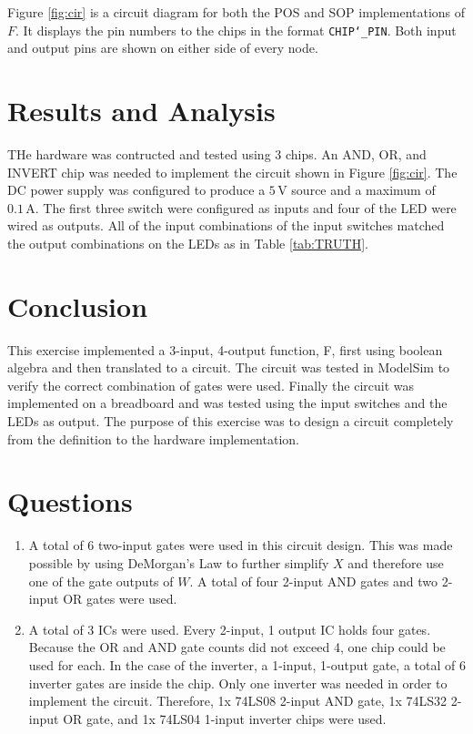 \documentclass[CMPE]{KGCOEReport}
\begin{document}
Figure \ref{fig:cir} is a circuit diagram for both the POS and SOP implementations of $F$. It displays the pin numbers to the chips in the format \texttt{CHIP\char`_PIN}. Both input and output pins are shown on either side of every node.

\section*{Results and Analysis}

THe hardware was contructed and tested using 3 chips. An AND, OR, and INVERT chip was needed to implement the circuit shown in Figure \ref{fig:cir}. The DC power supply was configured to produce a $5\,\si\volt$ source and a maximum of $0.1\,\si\ampere$. The first three switch were configured as inputs and four of the LED were wired as outputs. All of the input combinations of the input switches matched the output combinations on the LEDs as in Table \ref{tab:TRUTH}.

\section*{Conclusion}

This exercise implemented a 3-input, 4-output function, F, first using boolean algebra and then translated to a circuit. The circuit was tested in ModelSim to verify the correct combination of gates were used. Finally the circuit was implemented on a breadboard and was tested using the input switches and the LEDs as output. The purpose of this exercise was to design a circuit completely from the definition to the hardware implementation.

\section*{Questions}

\begin{enumerate}
  \item A total of 6 two-input gates were used in this circuit design. This was made possible by using DeMorgan's Law to further simplify $X$ and therefore use one of the gate outputs of $W$. A total of four 2-input AND gates and two 2-input OR gates were used.

  \item A total of 3 ICs were used. Every 2-input, 1 output IC holds four gates. Because the OR and AND gate counts did not exceed 4, one chip could be used for each. In the case of the inverter, a 1-input, 1-output gate, a total of 6 inverter gates are inside the chip. Only one inverter was needed in order to implement the circuit. Therefore, 1x 74LS08 2-input AND gate, 1x 74LS32 2-input OR gate, and 1x 74LS04 1-input inverter chips were used.
\end{enumerate}
\end{document}
